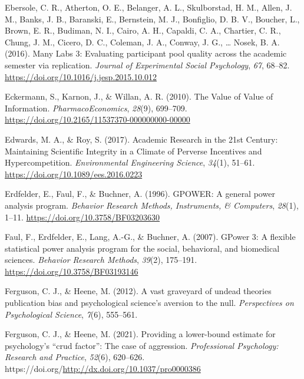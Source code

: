 \documentclass[
  letterpaper,
  DIV=11,
  numbers=noendperiod]{scrreprt}
\newlength{\cslhangindent}
\newlength{\cslentryspacingunit} %
\newenvironment{CSLReferences}[2] %
 {%
  \setlength{\parindent}{0pt}
  \ifodd #1
  \let\oldpar\par
  \def\par{\hangindent=\cslhangindent\oldpar}
  \fi
  \setlength{\parskip}{#2\cslentryspacingunit}
 }%
 {}
\begin{document}
\begin{CSLReferences}{1}{0}
\leavevmode{}%
Ebersole, C. R., Atherton, O. E., Belanger, A. L., Skulborstad, H. M.,
Allen, J. M., Banks, J. B., Baranski, E., Bernstein, M. J., Bonfiglio,
D. B. V., Boucher, L., Brown, E. R., Budiman, N. I., Cairo, A. H.,
Capaldi, C. A., Chartier, C. R., Chung, J. M., Cicero, D. C., Coleman,
J. A., Conway, J. G., \ldots{} Nosek, B. A. (2016). Many {Labs} 3:
{Evaluating} participant pool quality across the academic semester via
replication. \emph{Journal of Experimental Social Psychology},
\emph{67}, 68--82. \url{https://doi.org/10.1016/j.jesp.2015.10.012}

\leavevmode{}%
Eckermann, S., Karnon, J., \& Willan, A. R. (2010). The {Value} of
{Value} of {Information}. \emph{PharmacoEconomics}, \emph{28}(9),
699--709. \url{https://doi.org/10.2165/11537370-000000000-00000}

\leavevmode{}%
Edwards, M. A., \& Roy, S. (2017). Academic {Research} in the 21st
{Century}: {Maintaining Scientific Integrity} in a {Climate} of
{Perverse Incentives} and {Hypercompetition}. \emph{Environmental
Engineering Science}, \emph{34}(1), 51--61.
\url{https://doi.org/10.1089/ees.2016.0223}

\leavevmode{}%
Erdfelder, E., Faul, F., \& Buchner, A. (1996). {GPOWER}: {A} general
power analysis program. \emph{Behavior Research Methods, Instruments, \&
Computers}, \emph{28}(1), 1--11.
\url{https://doi.org/10.3758/BF03203630}

\leavevmode{}%
Faul, F., Erdfelder, E., Lang, A.-G., \& Buchner, A. (2007). {GPower} 3:
{A} flexible statistical power analysis program for the social,
behavioral, and biomedical sciences. \emph{Behavior Research Methods},
\emph{39}(2), 175--191. \url{https://doi.org/10.3758/BF03193146}

\leavevmode{}%
Ferguson, C. J., \& Heene, M. (2012). A vast graveyard of undead
theories publication bias and psychological science's aversion to the
null. \emph{Perspectives on Psychological Science}, \emph{7}(6),
555--561.

\leavevmode{}%
Ferguson, C. J., \& Heene, M. (2021). Providing a lower-bound estimate
for psychology's {``crud factor''}: {The} case of aggression.
\emph{Professional Psychology: Research and Practice}, \emph{52}(6),
620--626. https://doi.org/\url{http://dx.doi.org/10.1037/pro0000386}


\end{CSLReferences}
\end{document}
